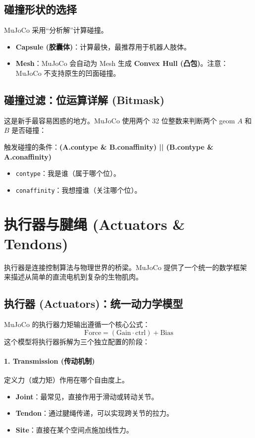\documentclass[11pt,a4paper]{book}
\begin{document}
\subsection{碰撞形状的选择}
MuJoCo 采用“分析解”计算碰撞。
\begin{itemize}
    \item \textbf{Capsule (胶囊体)}：计算最快，最推荐用于机器人肢体。
    \item \textbf{Mesh}：MuJoCo 会自动为 Mesh 生成 \textbf{Convex Hull (凸包)}。注意：MuJoCo 不支持原生的凹面碰撞。
\end{itemize}

\subsection{碰撞过滤：位运算详解 (Bitmask)}
这是新手最容易困惑的地方。MuJoCo 使用两个 32 位整数来判断两个 geom $A$ 和 $B$ 是否碰撞：
\begin{tcolorbox}[colback=blue!5, title=碰撞触发公式]
触发碰撞的条件：\textbf{(A.contype \& B.conaffinity) || (B.contype \& A.conaffinity)}
\end{tcolorbox}
\begin{itemize}
    \item \texttt{contype}：我是谁（属于哪个位）。
    \item \texttt{conaffinity}：我想撞谁（关注哪个位）。
\end{itemize}



\section{执行器与腱绳 (Actuators \& Tendons)}

执行器是连接控制算法与物理世界的桥梁。MuJoCo 提供了一个统一的数学框架来描述从简单的直流电机到复杂的生物肌肉。

\subsection{执行器 (Actuators)：统一动力学模型}
MuJoCo 的执行器力矩输出遵循一个核心公式：
\begin{equation}
\text{Force} = (\text{Gain} \cdot \text{ctrl}) + \text{Bias}
\end{equation}
这个模型将执行器拆解为三个独立配置的阶段：

\paragraph{1. Transmission (传动机制)} 
定义力（或力矩）作用在哪个自由度上。
\begin{itemize}
    \item \textbf{Joint}：最常见，直接作用于滑动或转动关节。
    \item \textbf{Tendon}：通过腱绳传递，可以实现跨关节的拉力。
    \item \textbf{Site}：直接在某个空间点施加线性力。
\end{itemize}
\end{document}
